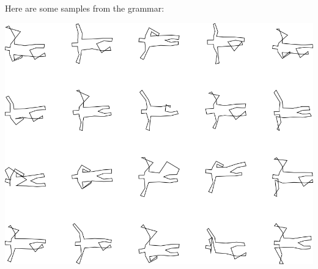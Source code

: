 Here are some samples from the grammar:

\includegraphics[width=6in]{output/3.learning/incremental/gram.24.d/samples.png}

